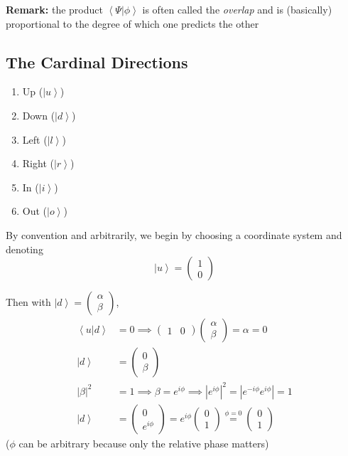 \documentclass[12pt]{article}
\newcommand{\brak}[1]{\left\langle #1 \right\rangle}
\newcommand{\ket}[1]{\left\vert #1 \right\rangle}
\begin{document}
\textbf{Remark:} the product $\brak{\Psi | \phi}$ is often called the \emph{overlap} and is (basically) proportional to the degree of which one predicts the other 

\subsection*{The Cardinal Directions}
\begin{enumerate}
    \item Up ($\ket{u}$)
    \item Down ($\ket{d}$)
    \item Left ($\ket{l}$)
    \item Right ($\ket{r}$)
    \item In ($\ket{i}$)
    \item Out ($\ket{o}$)
\end{enumerate}

By convention and arbitrarily, we begin by choosing a coordinate system and denoting 
\[\ket{u} = \begin{pmatrix}
    1\\0
\end{pmatrix}\]

Then with $\ket{d} = \begin{pmatrix}
    \alpha\\\beta
\end{pmatrix}$, 
\begin{align*}
    \brak{u | d} &= 0 \implies \begin{pmatrix}
        1 & 0
    \end{pmatrix} \begin{pmatrix}
        \alpha\\\beta
    \end{pmatrix} = \alpha = 0\\
    \ket{d} &= \begin{pmatrix}
        0\\ \beta
    \end{pmatrix}\\
    |\beta|^2 &= 1 \implies \beta = e^{i\phi} \implies |e^{i\phi}|^2 = |e^{-i\phi}e^{i\phi}| = 1\\
    \ket{d} &= \begin{pmatrix}
        0\\e^{i\phi} 
    \end{pmatrix} = e^{i\phi} \begin{pmatrix}
        0\\1
    \end{pmatrix} \overset{\phi = 0}{=} \begin{pmatrix}
        0\\1
    \end{pmatrix}
\end{align*}
($\phi$ can be arbitrary because only the relative phase matters)
\end{document}
